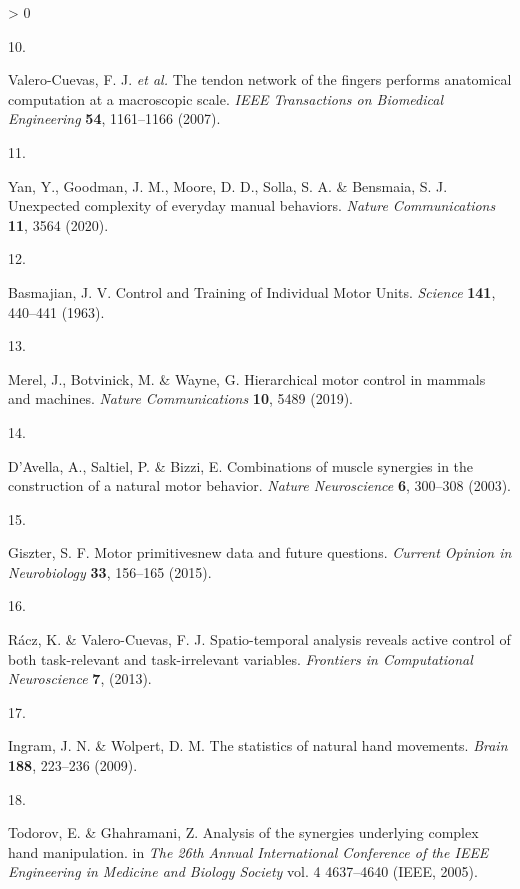 \documentclass[
  a4paper,
]{article}
\newlength{\cslhangindent}
\newlength{\csllabelwidth}
\newenvironment{CSLReferences}[2] %
 {%
  \setlength{\parindent}{0pt}
  \ifodd #1 \everypar{\setlength{\hangindent}{\cslhangindent}}\ignorespaces\fi
  \ifnum #2 > 0
  \setlength{\parskip}{#2\baselineskip}
  \fi
 }%
 {}
\newcommand{\CSLLeftMargin}[1]{\parbox[t]{\csllabelwidth}{#1}}
\newcommand{\CSLRightInline}[1]{\parbox[t]{\linewidth - \csllabelwidth}{#1}\break}
\begin{document}
\begin{CSLReferences}{0}{0}
\leavevmode\hypertarget{ref-Valero-Cuevas2007}{}%
\CSLLeftMargin{10. }
\CSLRightInline{Valero-Cuevas, F. J. \emph{et al.} The tendon network of
the fingers performs anatomical computation at a macroscopic scale.
\emph{IEEE Transactions on Biomedical Engineering} \textbf{54},
1161--1166 (2007).}

\leavevmode\hypertarget{ref-yanUnexpectedComplexityEveryday2020}{}%
\CSLLeftMargin{11. }
\CSLRightInline{Yan, Y., Goodman, J. M., Moore, D. D., Solla, S. A. \&
Bensmaia, S. J. Unexpected complexity of everyday manual behaviors.
\emph{Nature Communications} \textbf{11}, 3564 (2020).}

\leavevmode\hypertarget{ref-Basmajian1963}{}%
\CSLLeftMargin{12. }
\CSLRightInline{Basmajian, J. V. Control and {Training} of {Individual
Motor Units}. \emph{Science} \textbf{141}, 440--441 (1963).}

\leavevmode\hypertarget{ref-merelHierarchicalMotorControl2019}{}%
\CSLLeftMargin{13. }
\CSLRightInline{Merel, J., Botvinick, M. \& Wayne, G. Hierarchical motor
control in mammals and machines. \emph{Nature Communications}
\textbf{10}, 5489 (2019).}

\leavevmode\hypertarget{ref-DAvella2003}{}%
\CSLLeftMargin{14. }
\CSLRightInline{D'Avella, A., Saltiel, P. \& Bizzi, E. Combinations of
muscle synergies in the construction of a natural motor behavior.
\emph{Nature Neuroscience} \textbf{6}, 300--308 (2003).}

\leavevmode\hypertarget{ref-giszterMotorPrimitivesNew2015}{}%
\CSLLeftMargin{15. }
\CSLRightInline{Giszter, S. F. Motor primitives{}new data and future
questions. \emph{Current Opinion in Neurobiology} \textbf{33}, 156--165
(2015).}

\leavevmode\hypertarget{ref-raczSpatiotemporalAnalysisReveals2013}{}%
\CSLLeftMargin{16. }
\CSLRightInline{Rácz, K. \& Valero-Cuevas, F. J. Spatio-temporal
analysis reveals active control of both task-relevant and
task-irrelevant variables. \emph{Frontiers in Computational
Neuroscience} \textbf{7}, (2013).}

\leavevmode\hypertarget{ref-Ingram2009}{}%
\CSLLeftMargin{17. }
\CSLRightInline{Ingram, J. N. \& Wolpert, D. M. The statistics of
natural hand movements. \emph{Brain} \textbf{188}, 223--236 (2009).}

\leavevmode\hypertarget{ref-TodorovDimensionality2005}{}%
\CSLLeftMargin{18. }
\CSLRightInline{Todorov, E. \& Ghahramani, Z. Analysis of the synergies
underlying complex hand manipulation. in \emph{The 26th {Annual
International Conference} of the {IEEE Engineering} in {Medicine} and
{Biology Society}} vol. 4 4637--4640 ({IEEE}, 2005).}


\end{CSLReferences}
\end{document}
